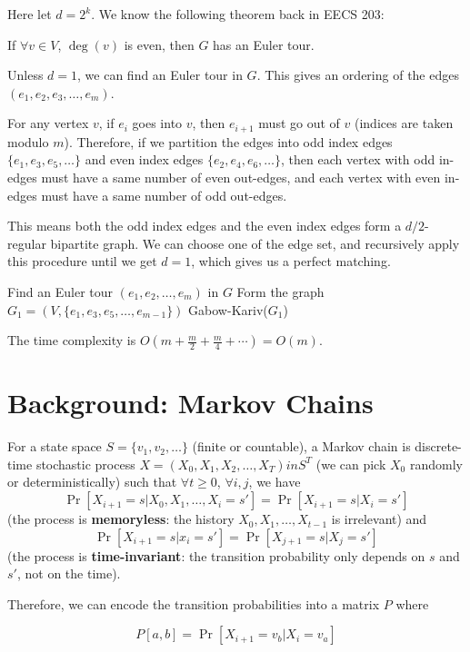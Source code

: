 Here let $d = 2^k$.
We know the following theorem back in EECS 203:

\begin{theorem}
	If $\forall v\in V$, $\deg(v)$ is even, then $G$ has an Euler tour.
\end{theorem}

Unless $d = 1$, we can find an Euler tour in $G$. This gives an ordering of the edges $(e_1, e_2, e_3, \ldots, e_m)$.

For any vertex $v$, if $e_i$ goes into $v$, then $e_{i+1}$ must go out of $v$ (indices are taken modulo $m$). Therefore, if we partition the edges into odd index edges $\{e_1, e_3, e_5, \ldots\}$ and even index edges $\{e_2, e_4, e_6, \ldots\}$, then each vertex with odd in-edges must have a same number of even out-edges, and each vertex with even in-edges must have a same number of odd out-edges.

This means both the odd index edges and the even index edges form a $d/2$-regular bipartite graph. We can choose one of the edge set, and recursively apply this procedure until we get $d=1$, which gives us a perfect matching.

\begin{algorithm}[H]
	\caption{Gabow-Kariv Algorithm}
	Find an Euler tour $(e_1, e_2, \ldots, e_m)$ in $G$\;
	Form the graph $G_1 = (V,\{e_1, e_3, e_5, \ldots, e_{m-1}\})$\;
	\Return Gabow-Kariv($G_1$)\;
\end{algorithm}

The time complexity is $O(m + \frac{m}{2} + \frac{m}{4} + \cdots) = O(m)$.

\section{Background: Markov Chains}

\begin{definition}
	For a state space $S = \{ v_1, v_2, \ldots\}$ (finite or countable), a Markov chain is discrete-time stochastic process $X = (X_0, X_1, X_2, \ldots, X_T) in S^T$ (we can pick $X_0$ randomly or deterministically) such that $\forall t \ge 0$, $\forall i, j$, we have
	\[
		\Pr[X_{i+1} = s | X_0, X_1, \ldots, X_i = s'] = \Pr[X_{i+1} = s | X_i = s']
	\]
	(the process is \textbf{memoryless}: the history $X_0, X_1, \ldots, X_{t-1}$ is irrelevant) and
	\[
		\Pr[X_{i+1} = s | x_i = s'] = \Pr[X_{j+1} = s | X_j = s']
	\]
	(the process is \textbf{time-invariant}: the transition probability only depends on $s$ and $s'$, not on the time).

	Therefore, we can encode the transition probabilities into a matrix $P$ where

	\[
		P[a,b] = \Pr[X_{i+1} = v_b | X_i = v_a]
	\]

\end{definition}

